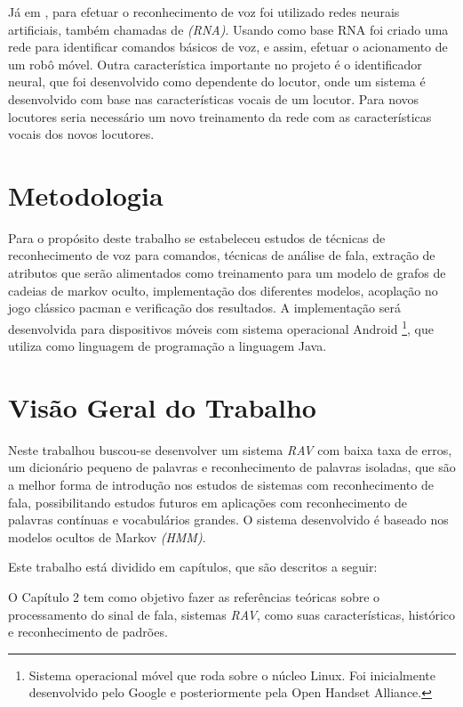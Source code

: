 Já em , para efetuar o reconhecimento de voz foi utilizado redes neurais artificiais, também chamadas de \textit{(RNA)}. Usando como base RNA foi criado uma rede para identificar comandos básicos de voz, e assim, efetuar o acionamento de um robô móvel. Outra característica importante no projeto é o identificador neural, que foi desenvolvido como dependente do locutor, onde um sistema é desenvolvido com base nas características vocais de um locutor. Para novos locutores seria necessário um novo treinamento da rede com as características vocais dos novos locutores.

\section{Metodologia}
Para o propósito deste trabalho se estabeleceu estudos de técnicas de reconhecimento de voz para comandos, técnicas de análise de fala, extração de atributos que serão alimentados como treinamento para um modelo de grafos de cadeias de markov oculto, implementação dos diferentes modelos, acoplação no jogo clássico pacman e verificação dos resultados. A implementação será desenvolvida para dispositivos móveis com sistema operacional Android \footnote{Sistema operacional móvel que roda sobre o núcleo Linux. Foi inicialmente desenvolvido pelo Google e posteriormente pela Open Handset Alliance.}, que utiliza como linguagem de programação a linguagem Java.

\section{Visão Geral do Trabalho}
Neste trabalhou buscou-se desenvolver um sistema \textit{RAV} com baixa taxa de erros, um dicionário pequeno de palavras e reconhecimento de palavras isoladas, que são a melhor forma de introdução nos estudos de sistemas com reconhecimento de fala, possibilitando estudos futuros em aplicações com reconhecimento de palavras contínuas e vocabulários grandes. O sistema desenvolvido é baseado nos modelos ocultos de Markov \textit{(HMM)}. 

Este trabalho está dividido em %
capítulos, que são descritos a seguir:

O Capítulo 2 tem como objetivo fazer as referências teóricas sobre o processamento do sinal de fala, sistemas \textit{RAV}, como suas características, histórico e reconhecimento de padrões.









